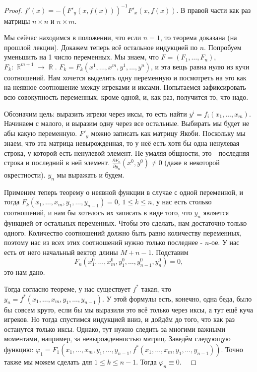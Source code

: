 \documentclass[a4paper,100pt]{article}
\theoremstyle{indented}
\theoremstyle{definition}
\theoremstyle{remark}
\DeclareMathOperator{\RR}{\mathbb{R}}
\begin{document}
\begin{proof}
    $f'(x)=-(F'_y(x, f(x)))^{-1}F'_x(x, f(x))$. В правой части как раз матрицы $n\times n$ и $n\times m$. \ 

    Мы сейчас находимся в положении, что если $n=1$, то теорема доказана (на прошлой лекции). Докажем теперь всё остальное индукцией по $n$. Попробуем уменьшить на 1 число переменных. Мы знаем, что $F=(F_1, \ldots, F_n)$, $F_k:\RR^{m+1}\rightarrow \RR$. $F_k = F_k(x^1, \ldots, x^m, y^1, \ldots, y^n)$, и эта вещь равна нулю из кучи соотношений. Нам хочется выделить одну переменную и посмотреть на это как на неявное соотношение между игреками и иксами. Попытаемся зафиксировать всю совокупность переменных, кроме одной, и, как раз, получится то, что надо. \ 
    
    Обозначим цель: выразить игреки через иксы, то есть найти $y^i=f_i(x_1, \ldots, x_m)$. Начинаем с малого, и выразим одну через все остальные. Выбирать мы будет не абы какую переменную. $F'_y$ можно записать как матрицу Якоби. Поскольку мы знаем, что эта матрица невырожденная, то у неё есть хотя бы одна ненулевая строка, у которой есть ненулевой элемент. Не умаляя общности, это - последняя строка и последний в ней элемент. $\frac{\partial F_n}{\partial y_n}(x^0, y^0)\neq 0$ (даже в некоторой окрестности). $y_n$ мы выражать и будем. \ 

    Применим теперь теорему о неявной функции в случае с одной переменной, и тогда $F_k(x_1, \ldots, x_m, y_1, \ldots, y_{n-1}) = 0$, $1\leq k\leq n$, у нас есть столько соотношений, и нам бы хотелось их записать в виде того, что $y_n$ является функцией от остальных переменных. Чтобы это сделать, нам достаточно только одного. Количество соотношений должно быть равно количеству переменных, поэтому нас из всех этих соотношений нужно только последнее - $n$-ое. У нас есть от него начальный вектор длины $M+n-1$. Подставим 
    \[
        F_n(x_1^0, \ldots, x_m^0, y_1^0, \ldots, y_{n-1}^0, y_n^0) = 0,
    \]    
    это нам дано. \ 

    Тогда согласно теореме, у нас существует $f^*$ такая, что $y_n=f^*(x_1, \ldots, x_m, y_1, \ldots, y_{n-1})$. У этой формулы есть, конечно, одна беда, было бы совсем круто, если бы мы выразили это всё только через иксы, а тут ещё куча игреков. Но тогда спустимся индукцией вниз, и дойдём до того, что как раз останутся только иксы. Однако, тут нужно следить за многими важными моментами, например, за невырожденностью матриц. Заведём следующую функцию: $\varphi_1 = F_1(x_1, \ldots, x_m, y_1, \ldots, y_{n-1}, f^*(x_1, \ldots, x_m, y_1, \ldots, y_{n-1}))$. Точно также мы можем сделать для $1\leq k\leq n-1$. Тогда $\varphi_n \equiv 0$. \ 


\end{proof}
\end{document}
